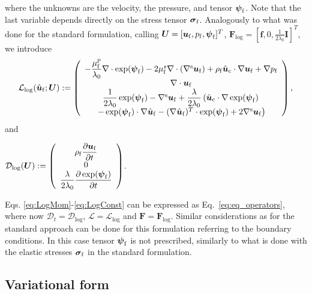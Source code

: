\documentclass[11pt,english]{article}
\def\ufluid{\boldsymbol{u}_{\rm{f}}}
\def\ufluidhat{\hat{\boldsymbol{u}}_{\rm{f}}}
\def\sigmafluid{\boldsymbol{\sigma}_{\rm{f}}}
\def\pfluid{p_{\rm{f}}}
\def\psifluid{\boldsymbol{\psi}_{\rm{f}}}
\def\viscs{\mu^{s}_{\rm{f}}}
\def\viscp{\mu^{p}_{\rm{f}}}
\def\alevelocityhat{\hat{\boldsymbol{u}}_{\mathrm{c}}}
\begin{document}
where the unknowns are the velocity, the pressure, and tensor $\psifluid$. Note that the last variable depends directly on the stress tensor $\sigmafluid$. Analogously to what was done for the standard formulation, calling
$\boldsymbol{U}=[\ufluid,\pfluid,\psifluid]^T$, $\boldsymbol{F}_{\text{log}}=[\boldsymbol{f},0,\frac{1}{2\lambda_{0}}\boldsymbol{I}]^T$,
we introduce
\begin{equation*}
    \mathcal{L}_{\log}(\ufluidhat;\boldsymbol{U}):=\left(\begin{array}{c}
    -\dfrac{\viscp}{\lambda_{0}}\nabla\cdot\exp(\psifluid)-2\viscs\nabla\cdot(\nabla^{\rm s}\ufluid)+\rho_{\rm{f}}\alevelocityhat\cdot\nabla\ufluid+\nabla \pfluid\\
    \nabla\cdot\ufluid\\
    \dfrac{1}{2\lambda_{0}}\exp(\psifluid)-\nabla^{\rm s}\ufluid+\dfrac{\lambda}{2\lambda_{0}}\left(\alevelocityhat\cdot\nabla\exp(\psifluid)\right.\\
    \left.-\exp(\psifluid)\cdot\nabla\ufluidhat-(\nabla\ufluidhat)^{T}\cdot\exp(\psifluid)+2\nabla^{\rm s}\ufluid\right)
    \end{array}\right),\label{eq:operatorLCR_lin}
\end{equation*}
and 
\noindent \begin{center}
$\mathcal{D}_{\log}(\boldsymbol{U}):=\left(\begin{array}{c}
\rho_{\rm{f}}\dfrac{\partial\ufluid}{\partial t}\\
0\\
\dfrac{\lambda}{2\lambda_{0}}\dfrac{\partial\exp(\psifluid)}{\partial t}
\end{array}\right)$. 
\par\end{center}

Eqs. \eqref{eq:LogMom}-\eqref{eq:LogConst} can be expressed
as Eq.~\eqref{eq:eq_operators}, where now $\mathcal{D}_{t}=\mathcal{\mathcal{D}}_{\log}$,
$\mathcal{L}=\mathcal{L}_{\log}$ and $\boldsymbol{F}=\boldsymbol{F}_{\log}$.
 Similar considerations as for the standard approach can be done for this formulation referring
to the boundary conditions. In this case tensor $\psifluid$
is not prescribed, similarly to what is done with the elastic stresses
$\sigmafluid$ in the standard formulation.

\subsection{Variational form}
\end{document}
